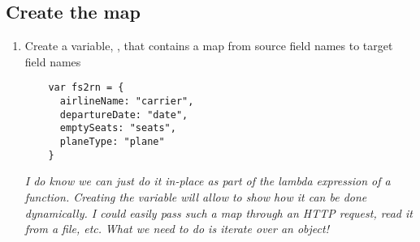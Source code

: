 \subsection{Create the map}
\begin{enumerate}[resume*]
\item Create a variable, , that contains a map from source field names to target field names
  \begin{verbatim}
    var fs2rn = {
      airlineName: "carrier",
      departureDate: "date",
      emptySeats: "seats",
      planeType: "plane"
    }
  \end{verbatim}
  \emph{
    I do know we can just do it in-place as part of the lambda expression of a  function. Creating the variable will allow to show how it can be done dynamically.  I could easily pass such a map through an HTTP request, read it from a file, etc.
  }
  \newline
  \emph{
    What we need to do is iterate over an object!
  }
\end{enumerate}

